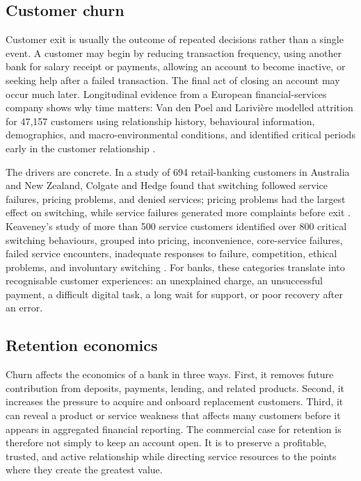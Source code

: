 \documentclass[a4paper,12pt]{article}
\begin{document}
\subsection{Customer churn}

Customer exit is usually the outcome of repeated decisions rather than a single event. A customer may begin by reducing transaction frequency, using another bank for salary receipt or payments, allowing an account to become inactive, or seeking help after a failed transaction. The final act of closing an account may occur much later. Longitudinal evidence from a European financial-services company shows why time matters: Van den Poel and Larivi\`ere modelled attrition for 47,157 customers using relationship history, behavioural information, demographics, and macro-environmental conditions, and identified critical periods early in the customer relationship \citep{vandenpoelLariviere2004}.

The drivers are concrete. In a study of 694 retail-banking customers in Australia and New Zealand, Colgate and Hedge found that switching followed service failures, pricing problems, and denied services; pricing problems had the largest effect on switching, while service failures generated more complaints before exit \citep{colgateHedge2001}. Keaveney's study of more than 500 service customers identified over 800 critical switching behaviours, grouped into pricing, inconvenience, core-service failures, failed service encounters, inadequate responses to failure, competition, ethical problems, and involuntary switching \citep{keaveney1995}. For banks, these categories translate into recognisable customer experiences: an unexplained charge, an unsuccessful payment, a difficult digital task, a long wait for support, or poor recovery after an error.

\subsection{Retention economics}

Churn affects the economics of a bank in three ways. First, it removes future contribution from deposits, payments, lending, and related products. Second, it increases the pressure to acquire and onboard replacement customers. Third, it can reveal a product or service weakness that affects many customers before it appears in aggregated financial reporting. The commercial case for retention is therefore not simply to keep an account open. It is to preserve a profitable, trusted, and active relationship while directing service resources to the points where they create the greatest value.
\end{document}
